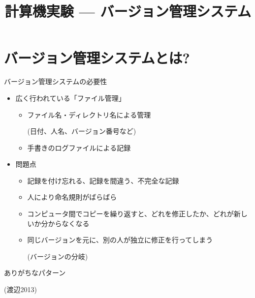 \documentclass[dvipdfmx]{beamer}
\title{計算機実験 --- バージョン管理システム}
\begin{document}

\begin{frame}
  \titlepage
  \tableofcontents
\end{frame}

\section{バージョン管理システムとは?}

\begin{frame}[t,fragile]{バージョン管理システムの必要性}
  \begin{itemize}
    \setlength{\itemsep}{1em}
  \item 広く行われている「ファイル管理」
    \begin{itemize}
    \item ファイル名・ディレクトリ名による管理

      (日付、人名、バージョン番号など)
    \item 手書きのログファイルによる記録
    \end{itemize}
  \item 問題点
    \begin{itemize}
    \item 記録を付け忘れる、記録を間違う、不完全な記録
    \item 人により命名規則がばらばら
    \item コンピュータ間でコピーを繰り返すと、どれを修正したか、どれが新しいか分からなくなる
    \item 同じバージョンを元に、別の人が独立に修正を行ってしまう

      (バージョンの分岐)
    \end{itemize}
  \end{itemize}
\end{frame}

\begin{frame}[t,fragile]{ありがちなパターン}
  \vspace*{-1.8em}
  \begin{center}
  \end{center}
  \vspace*{-2em}
  {\footnotesize (渡辺2013)}
\end{frame}
\end{document}
